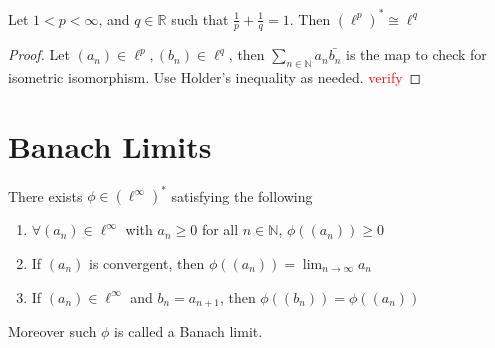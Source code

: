 \begin{theorem}
  Let $1 < p < \infty$, and $ q \in \mathbb{R}$ such that $
  \frac{1}{p} + \frac{1}{q} = 1 $. Then $(\ell^p)^{*} \cong \ell^q$
\end{theorem}
\begin{proof}
  Let $(a_n) \in \ell^p, (b_n) \in \ell^q$, then $\sum_{n \in
  \mathbb{N}} a_n \bar{b_n}$ is the map to check for isometric isomorphism.
  Use Holder's inequality as needed. \textcolor{red}{verify}
\end{proof}

\section{Banach Limits}

\begin{theorem}
  There exists $\phi \in (\ell^\infty)^{*}$ satisfying the following
  \begin{enumerate}[label=\arabic*]
    \item $\forall (a_n) \in \ell^\infty$ with $a_n \ge 0$ for all $
      n \in \mathbb{N}$, $\phi((a_n)) \ge 0$
    \item If $(a_n)$ is convergent, then $\phi((a_n)) = \lim_{n \to
      \infty}  a_n$
    \item If $(a_n) \in \ell^\infty$ and $b_n = a_{n+1}$, then
      $\phi((b_n)) = \phi((a_n))$
  \end{enumerate}
  Moreover such $\phi$ is called a Banach limit.
\end{theorem}

